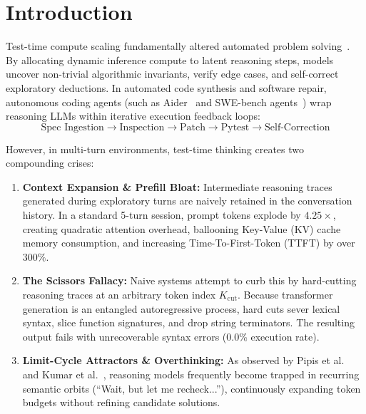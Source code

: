 \documentclass[10pt,twocolumn,letterpaper]{article}
\begin{document}
\begin{abstract}
Evaluated on an authentic 5-turn multi-agent state machine across stratified benchmark tasks (\texttt{leap}, \texttt{luhn}, and \texttt{circular-buffer}) and real CPU weights on \texttt{Qwen2.5-Coder-1.5B-Instruct}, SubNeutralize achieves a \textbf{100.0\% pass rate}, flattens prefill expansion from $4.25\times$ down to $3.65\times$, achieves $\ge 55\%$ physical KV cache VRAM reduction, and slashes prefill compute by \textbf{11.2\%} with zero auxiliary training parameters.
\end{abstract}

\section{Introduction}
Test-time compute scaling fundamentally altered automated problem solving~\cite{openai2024o1,deepseek2025r1,snell2024scaling,muennighoff2025s1}. By allocating dynamic inference compute to latent reasoning steps, models uncover non-trivial algorithmic invariants, verify edge cases, and self-correct exploratory deductions. In automated code synthesis and software repair, autonomous coding agents (such as Aider~\cite{gauthier2024aider} and SWE-bench agents~\cite{jimenez2024swebench}) wrap reasoning LLMs within iterative execution feedback loops:
\begin{equation}
\text{Spec Ingestion} \to \text{Inspection} \to \text{Patch} \to \text{Pytest} \to \text{Self-Correction}
\end{equation}

However, in multi-turn environments, test-time thinking creates two compounding crises:
\begin{enumerate}
    \item \textbf{Context Expansion \& Prefill Bloat:} Intermediate reasoning traces generated during exploratory turns are naively retained in the conversation history. In a standard 5-turn session, prompt tokens explode by $4.25\times$, creating quadratic attention overhead, ballooning Key-Value (KV) cache memory consumption, and increasing Time-To-First-Token (TTFT) by over $300\%$.
    \item \textbf{The Scissors Fallacy:} Naive systems attempt to curb this by hard-cutting reasoning traces at an arbitrary token index $K_{\text{cut}}$. Because transformer generation is an entangled autoregressive process, hard cuts sever lexical syntax, slice function signatures, and drop string terminators. The resulting output fails with unrecoverable syntax errors (0.0\% execution rate).
    \item \textbf{Limit-Cycle Attractors \& Overthinking:} As observed by Pipis et al.~\cite{pipis2025wait} and Kumar et al.~\cite{kumar2025overthink}, reasoning models frequently become trapped in recurring semantic orbits (``Wait, but let me recheck...''), continuously expanding token budgets without refining candidate solutions.
\end{enumerate}
\end{document}
